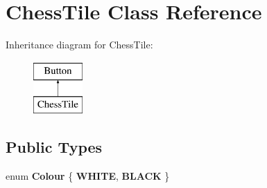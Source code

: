 \hypertarget{classChessTile}{}\section{Chess\+Tile Class Reference}
\label{classChessTile}
Inheritance diagram for Chess\+Tile\+:\begin{figure}[H]
\begin{center}
\leavevmode
\includegraphics[height=2.000000cm]{classChessTile}
\end{center}
\end{figure}
\subsection*{Public Types}
\begin{DoxyCompactItemize}
\item 
\mbox{\label{classChessTile_a9c573776c908586046e63facd4756e4d}} 
enum {\bfseries Colour} \{ {\bfseries W\+H\+I\+TE}, 
{\bfseries B\+L\+A\+CK}
 \}
\end{DoxyCompactItemize}
